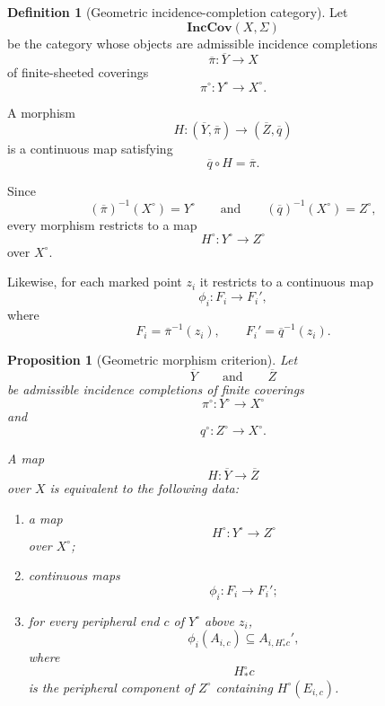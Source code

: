 \documentclass[11pt]{article}
\theoremstyle{plain}
\newtheorem{proposition}[theorem]{Proposition}
\theoremstyle{definition}
\newtheorem{definition}[theorem]{Definition}
\begin{document}
\begin{definition}[Geometric incidence-completion category]
\label{def:geometric-incidence-category}
Let
\[
\mathbf{IncCov}(X,\Sigma)
\]
be the category whose objects are admissible incidence completions
\[
\overline\pi:
\overline Y\longrightarrow X
\]
of finite-sheeted coverings
\[
\pi^\circ:
Y^\circ\longrightarrow X^\circ.
\]

A morphism
\[
H:
(\overline Y,\overline\pi)
\longrightarrow
(\overline Z,\overline q)
\]
is a continuous map satisfying
\[
\overline q\circ H=\overline\pi.
\]
\end{definition}

Since
\[
(\overline\pi)^{-1}(X^\circ)=Y^\circ
\qquad\text{and}\qquad
(\overline q)^{-1}(X^\circ)=Z^\circ,
\]
every morphism restricts to a map
\[
H^\circ:
Y^\circ\longrightarrow Z^\circ
\]
over $X^\circ$.

Likewise, for each marked point $z_i$ it restricts to a continuous map
\[
\phi_i:
F_i\longrightarrow F_i',
\]
where
\[
F_i=\overline\pi^{-1}(z_i),
\qquad
F_i'=\overline q^{-1}(z_i).
\]

\begin{proposition}[Geometric morphism criterion]
\label{prop:geometric-morphism-criterion}
Let
\[
\overline Y
\qquad\text{and}\qquad
\overline Z
\]
be admissible incidence completions of finite coverings
\[
\pi^\circ:Y^\circ\to X^\circ
\]
and
\[
q^\circ:Z^\circ\to X^\circ.
\]

A map
\[
H:\overline Y\to\overline Z
\]
over $X$ is equivalent to the following data:

\begin{enumerate}[label=(\roman*)]
\item a map
\[
H^\circ:Y^\circ\to Z^\circ
\]
over $X^\circ$;

\item continuous maps
\[
\phi_i:F_i\to F_i';
\]

\item for every peripheral end $c$ of $Y^\circ$ above $z_i$,
\[
\phi_i(A_{i,c})
\subseteq
A_{i,H^\circ_*c}' ,
\]
where
\[
H^\circ_*c
\]
is the peripheral component of $Z^\circ$ containing
$H^\circ(E_{i,c})$.
\end{enumerate}
\end{proposition}
\end{document}
